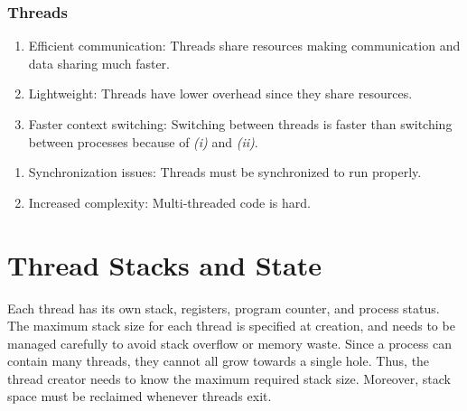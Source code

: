 \documentclass{report}
\begin{document}
\subsubsection*{Threads}
\begin{tcbraster}[raster columns=2, raster equal height, raster force size=false]
  \begin{tcolorbox}[colback=green!5!white,colframe=black!75!green,title=Advantages]
    \begin{enumerate}[label=\textit{(\roman*)}]
    \item Efficient communication: Threads share resources making communication and data sharing
      much faster.
    \item Lightweight: Threads have lower overhead since they share resources.
    \item Faster context switching: Switching between threads is faster than switching between
      processes because of \textit{(i)} and \textit{(ii)}.
    \end{enumerate}
  \end{tcolorbox}
  \begin{tcolorbox}[colback=red!5!white,colframe=black!40!red,title=Disadvantages]
    \begin{enumerate}[label=\textit{(\roman*)}]
    \item Synchronization issues: Threads must be synchronized to run properly.
    \item Increased complexity: Multi-threaded code is hard.
    \end{enumerate}
  \end{tcolorbox}
\end{tcbraster}





\section{Thread Stacks and State}
Each thread has its own stack, registers, program counter, and process status. The maximum stack size for
each thread is specified at creation, and needs to be managed carefully to avoid stack overflow or
memory waste. Since a process can contain many threads, they cannot all grow towards a single
hole. Thus, the thread creator needs to know the maximum required stack size. Moreover, stack space
must be reclaimed whenever threads exit.
\end{document}
